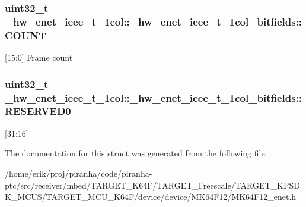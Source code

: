 \subsubsection[{\texorpdfstring{C\+O\+U\+NT}{COUNT}}]{\setlength{\rightskip}{0pt plus 5cm}uint32\+\_\+t \+\_\+hw\+\_\+enet\+\_\+ieee\+\_\+t\+\_\+1col\+::\+\_\+hw\+\_\+enet\+\_\+ieee\+\_\+t\+\_\+1col\+\_\+bitfields\+::\+C\+O\+U\+NT}\hypertarget{struct__hw__enet__ieee__t__1col_1_1__hw__enet__ieee__t__1col__bitfields_a60ee7623e72bc7cf2808e5ed0065818f}{}\label{struct__hw__enet__ieee__t__1col_1_1__hw__enet__ieee__t__1col__bitfields_a60ee7623e72bc7cf2808e5ed0065818f}
\mbox{[}15\+:0\mbox{]} Frame count 
\subsubsection[{\texorpdfstring{R\+E\+S\+E\+R\+V\+E\+D0}{RESERVED0}}]{\setlength{\rightskip}{0pt plus 5cm}uint32\+\_\+t \+\_\+hw\+\_\+enet\+\_\+ieee\+\_\+t\+\_\+1col\+::\+\_\+hw\+\_\+enet\+\_\+ieee\+\_\+t\+\_\+1col\+\_\+bitfields\+::\+R\+E\+S\+E\+R\+V\+E\+D0}\hypertarget{struct__hw__enet__ieee__t__1col_1_1__hw__enet__ieee__t__1col__bitfields_afd784988f8d8f7110832bc7c88f8c62e}{}\label{struct__hw__enet__ieee__t__1col_1_1__hw__enet__ieee__t__1col__bitfields_afd784988f8d8f7110832bc7c88f8c62e}
\mbox{[}31\+:16\mbox{]} 

The documentation for this struct was generated from the following file\+:\begin{DoxyCompactItemize}
\item 
/home/erik/proj/piranha/code/piranha-\/ptc/src/receiver/mbed/\+T\+A\+R\+G\+E\+T\+\_\+\+K64\+F/\+T\+A\+R\+G\+E\+T\+\_\+\+Freescale/\+T\+A\+R\+G\+E\+T\+\_\+\+K\+P\+S\+D\+K\+\_\+\+M\+C\+U\+S/\+T\+A\+R\+G\+E\+T\+\_\+\+M\+C\+U\+\_\+\+K64\+F/device/device/\+M\+K64\+F12/M\+K64\+F12\+\_\+enet.\+h\end{DoxyCompactItemize}
